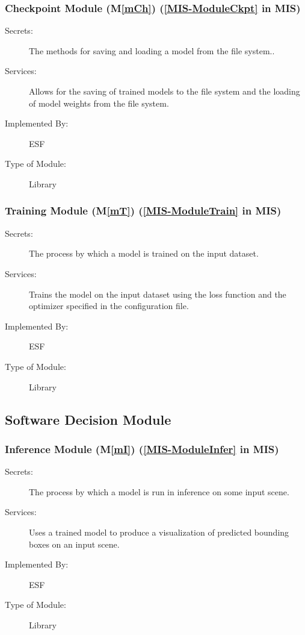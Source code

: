 \documentclass[12pt, titlepage]{article}
\newcommand{\ProjectName}{ESF }
\newcommand{\mref}[1]{M\ref{#1}}
\begin{document}
\subsubsection{Checkpoint Module (\mref{mCh}) (\ref{MIS-ModuleCkpt} in MIS)}
\begin{description}
\item[Secrets:] The methods for saving and loading a model from the file system..
\item[Services:] Allows for the saving of trained models to the file system and the loading of model weights from the file system.
\item[Implemented By:] \ProjectName{}
\item[Type of Module:] Library
\end{description}

\subsubsection{Training Module (\mref{mT}) (\ref{MIS-ModuleTrain} in MIS)}
\begin{description}
\item[Secrets:] The process by which a model is trained on the input dataset.
\item[Services:] Trains the model on the input dataset using the loss function and the optimizer specified in the configuration file.
\item[Implemented By:] \ProjectName{}
\item[Type of Module:] Library
\end{description}
\subsection{Software Decision Module}

\subsubsection{Inference Module (\mref{mI}) (\ref{MIS-ModuleInfer} in MIS)}
\begin{description}
\item[Secrets:] The process by which a model is run in inference on some input scene.
\item[Services:] Uses a trained model to produce a visualization of predicted bounding boxes on an input scene.
\item[Implemented By:] \ProjectName{}
\item[Type of Module:] Library
\end{description}
\end{document}
